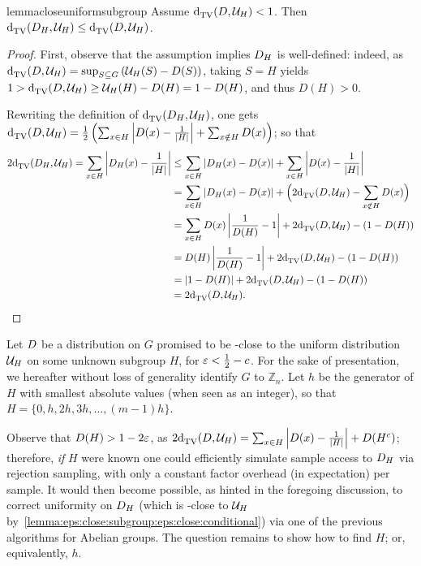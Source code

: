 \begin{restatable}{lemma}{closeuniformsubgroup}\label{lemma:eps:close:subgroup:eps:close:conditional}
Assume ${\operatorname{d}_{\textrm{TV}}^{}\!\left({D, \mathcal{U}_H}\right)} < 1$. Then ${\operatorname{d}_{\textrm{TV}}^{}\!\left({D_H, \mathcal{U}_H}\right)} \leq {\operatorname{d}_{\textrm{TV}}^{}\!\left({\ensuremath{D}, \ensuremath{\mathcal{U}}_H}\right)}$.
\end{restatable}
\begin{proof}
  First, observe that the assumption implies $D_H$ is well-defined: indeed, as 
  ${\operatorname{d}_{\textrm{TV}}^{}\!\left({D, \mathcal{U}_H}\right)} = \sup_{S\subseteq G}\left( \mathcal{U}_H(S)-D(S) \right)$, 
  taking $S=H$ yields $1 > {\operatorname{d}_{\textrm{TV}}^{}\!\left({D, \mathcal{U}_H}\right)} \geq \mathcal{U}_H(H)-D(H) = 1-D(H)$, 
  and thus $D(H) > 0$.

  Rewriting the definition of ${\operatorname{d}_{\textrm{TV}}^{}\!\left({D_H, \mathcal{U}_H}\right)}$, one gets ${\operatorname{d}_{\textrm{TV}}^{}\!\left({D, \mathcal{U}_H}\right)} = \frac{1}{2}\left( \sum_{x\in H} \left\lvert  D(x) - \frac{1}{\left\lvert H \right\rvert}  \right\rvert + \sum_{x\notin H} D(x)\right)$; so that
  \begin{align*}
    2{\operatorname{d}_{\textrm{TV}}^{}\!\left({D_H, \mathcal{U}_H}\right)} = \sum_{x\in H} \left\lvert  D_H(x) - \frac{1}{\left\lvert H \right\rvert}  \right\rvert 
    &\leq \sum_{x\in H} \left\lvert  D_H(x) - D(x)  \right\rvert  + \sum_{x\in H} \left\lvert  D(x) - \frac{1}{\left\lvert H \right\rvert}  \right\rvert \\
    &= \sum_{x\in H} \left\lvert  D_H(x) - D(x)  \right\rvert  + \Big(2{\operatorname{d}_{\textrm{TV}}^{}\!\left({D, \mathcal{U}_H}\right)} - \sum_{x\notin H} D(x)\Big) \\
    &= \sum_{x\in H} D(x)\left\lvert  \frac{1}{D(H)} - 1  \right\rvert  + 2{\operatorname{d}_{\textrm{TV}}^{}\!\left({D, \mathcal{U}_H}\right)} - \left(1-D(H)\right) \\
    &= D(H)\left\lvert  \frac{1}{D(H)} - 1  \right\rvert  + 2{\operatorname{d}_{\textrm{TV}}^{}\!\left({D, \mathcal{U}_H}\right)} - \left(1-D(H)\right) \\
    &= \left\lvert 1-D(H) \right\rvert + 2{\operatorname{d}_{\textrm{TV}}^{}\!\left({D, \mathcal{U}_H}\right)} - \left(1-D(H)\right)\\
    &= 2{\operatorname{d}_{\textrm{TV}}^{}\!\left({D, \mathcal{U}_H}\right)}.
  \end{align*}
\end{proof}

Let $D$ be a distribution on $G$ promised to be \eps-close to the uniform distribution $\mathcal{U}_H$ on some unknown subgroup $H$, for $\varepsilon < \frac{1}{2}-c$. For the sake of presentation, we hereafter without loss of generality identify $G$ to $\mathbb{Z}_n$. Let $h$ be the generator of $H$ with smallest absolute values (when seen as an integer), so that $H=\{0, h,2h,3h,\dots,(m-1)h\}$.

\noindent Observe that $D(H) > 1-2\varepsilon$, as $2{\operatorname{d}_{\textrm{TV}}^{}\!\left({D, \mathcal{U}_H}\right)} = \sum_{x\in H} \left\lvert  D(x) - \frac{1}{\left\lvert H \right\rvert}  \right\rvert + D(H^c)$; therefore, \emph{if} $H$ were known one could efficiently simulate sample access to $D_H$ via rejection sampling, with only a constant factor overhead (in expectation) per sample. It would then become possible, as hinted in the foregoing discussion, to correct uniformity on $D_H$ (which is \eps-close to $\mathcal{U}_H$ by~\cref{lemma:eps:close:subgroup:eps:close:conditional}) via one of the previous algorithms for Abelian groups. The question remains to show how to find $H$; or, equivalently, $h$.\medskip

